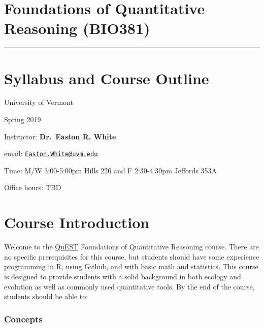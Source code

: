 \documentclass[12pt,]{article}
\title{}
\author{}
\date{}
\begin{document}
\section{Foundations of Quantitative Reasoning
(BIO381)}\label{foundations-of-quantitative-reasoning-bio381}

\begin{center}\rule{0.5\linewidth}{\linethickness}\end{center}

\section{Syllabus and Course Outline}\label{syllabus-and-course-outline}

University of Vermont

Spring 2019

Instructor: \textbf{Dr.~Easton R. White}

email:
\href{mailto:Easton.White@uvm.edu}{\nolinkurl{Easton.White@uvm.edu}}

Time: M/W 3:00-5:00pm Hills 226 and F 2:30-4:30pm Jeffords 353A

Office hours: TBD

\section{Course Introduction}\label{course-introduction}

Welcome to the \href{https://www.uvm.edu/quest}{QuEST} Foundations of
Quantitative Reasoning course. There are no specific prerequisites for
this course, but students should have some experience programming in R,
using Github, and with basic math and statistics. This course is
designed to provide students with a solid background in both ecology and
evolution as well as commonly used quantitative tools. By the end of the
course, students should be able to:

\subsubsection{Concepts}\label{concepts}
\end{document}
